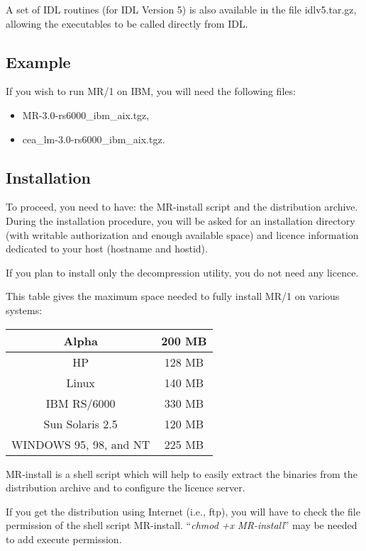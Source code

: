 A set of IDL routines (for IDL Version 5) is also available in the
file idlv5.tar.gz, allowing the executables to be called directly from IDL.

\subsection{Example}

If you wish to run MR/1 on IBM, you will need the following files:

\begin{itemize}
\item MR-3.0-rs6000\_ibm\_aix.tgz,
\item cea\_lm-3.0-rs6000\_ibm\_aix.tgz.
\end{itemize}

\subsection{Installation}

To proceed, you need to have: the MR-install script and the distribution
archive. During the installation procedure, you will be asked for an 
installation
directory (with writable authorization and enough available space) and licence
information dedicated to your host (hostname and hostid).

If you plan to install only the decompression utility, you do not need any 
licence.

This table gives the maximum space needed to fully install 
MR/1 on various systems:

\vspace{0.3cm}
{\centering \begin{tabular}{|c|c|}
\hline 
Alpha &
200 MB\\
\hline 
HP &
128 MB\\
\hline 
Linux &
140 MB\\
\hline 
IBM RS/6000&
330 MB\\
\hline 
Sun Solaris 2.5&
120 MB\\
\hline 
WINDOWS 95, 98, and NT &
225 MB\\
\hline 
\end{tabular}\par}
\vspace{0.3cm}

MR-install is a shell script which will help to easily extract the binaries
from the distribution archive and to configure the licence server.

If you get the distribution using Internet (i.e., ftp), you will have to 
check the file permission
of the shell script MR-install. ``\textsl{chmod +x MR-install}''
may be needed to add execute permission.

